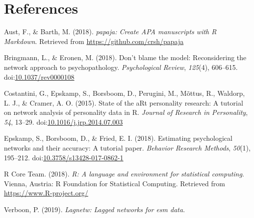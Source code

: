 \documentclass[man,floatsintext]{apa6}
\begin{document}
\newpage

\section{References}\label{references}

\begingroup
\setlength{\parindent}{-0.5in} \setlength{\leftskip}{0.5in}

\hypertarget{refs}{}
\hypertarget{ref-R-papaja}{}
Aust, F., \& Barth, M. (2018). \emph{papaja: Create APA manuscripts with
R Markdown}. Retrieved from \url{https://github.com/crsh/papaja}

\hypertarget{ref-Bringmann2018a}{}
Bringmann, L., \& Eronen, M. (2018). Don't blame the model:
Reconsidering the network approach to psychopathology.
\emph{Psychological Review}, \emph{125}(4), 606--615.
doi:\href{https://doi.org/10.1037/rev0000108}{10.1037/rev0000108}

\hypertarget{ref-Costantini2015}{}
Costantini, G., Epskamp, S., Borsboom, D., Perugini, M., Mõttus, R.,
Waldorp, L. J., \& Cramer, A. O. (2015). State of the aRt personality
research: A tutorial on network analysis of personality data in R.
\emph{Journal of Research in Personality}, \emph{54}, 13--29.
doi:\href{https://doi.org/10.1016/j.jrp.2014.07.003}{10.1016/j.jrp.2014.07.003}

\hypertarget{ref-Epskamp2018}{}
Epskamp, S., Borsboom, D., \& Fried, E. I. (2018). Estimating
psychological networks and their accuracy: A tutorial paper.
\emph{Behavior Research Methods}, \emph{50}(1), 195--212.
doi:\href{https://doi.org/10.3758/s13428-017-0862-1}{10.3758/s13428-017-0862-1}

\hypertarget{ref-R-base}{}
R Core Team. (2018). \emph{R: A language and environment for statistical
computing}. Vienna, Austria: R Foundation for Statistical Computing.
Retrieved from \url{https://www.R-project.org/}

\hypertarget{ref-R-lagnetw}{}
Verboon, P. (2019). \emph{Lagnetw: Lagged networks for esm data}.

\endgroup
\end{document}
